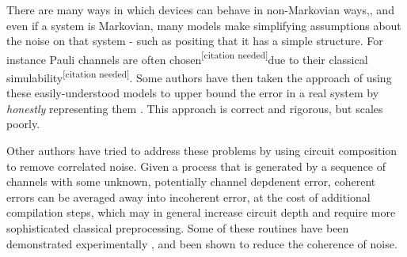 \documentclass[aps,nofootinbib,pra,notitlepage,twocolumn]{revtex4-1}
\newcommand{\needcite}{{\color{blue}\textsuperscript{[citation needed]}}}
\begin{document}

There are many ways in which devices can behave in non-Markovian ways,\cite{Kelly2018, BlumeKohout2017}, and even if a system is Markovian, many models make simplifying assumptions about the noise on that system - such as positing that it has a simple structure. For instance Pauli channels are often chosen\needcite due to their classical simulability\needcite. Some authors have then taken the approach of using these easily-understood models to upper bound the error in a real system by \textit{honestly} representing them \cite{Puzzuoli2014}. This approach is correct and rigorous, but scales poorly.

Other authors have tried to address these problems \cite{Wallman2016, Campbell2017, Heim2016} by using circuit composition to remove correlated noise. Given a process that is generated by a sequence of channels with some unknown, potentially channel depdenent error, coherent errors can be averaged away into incoherent error, at the cost of additional compilation steps, which may in general increase circuit depth and require more sophisticated classical preprocessing. Some of these routines have been demonstrated experimentally \cite{Ware2018}, and been shown to reduce the coherence of noise.


\end{document}
